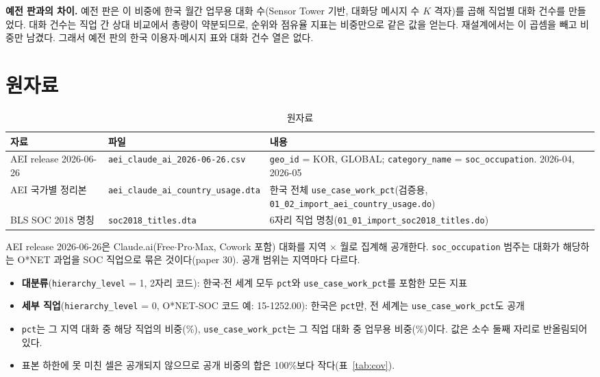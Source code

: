\documentclass[11pt]{article}
\begin{document}
\textbf{예전 판과의 차이.} 예전 판은 이 비중에 한국 월간 업무용 대화 수(Sensor Tower 기반, 대화당 메시지 수 $K$ 격자)를 곱해 직업별 대화 건수를 만들었다. 대화 건수는 직업 간 상대 비교에서 총량이 약분되므로, 순위와 점유율 지표는 비중만으로 같은 값을 얻는다. 재설계에서는 이 곱셈을 빼고 비중만 남겼다. 그래서 예전 판의 한국 이용자$\cdot$메시지 표와 대화 건수 열은 없다.

\section{원자료}

\begin{longtable}{L{3.6cm}L{5.2cm}L{6.4cm}}
\caption{원자료}\label{tab:src}\\
\toprule
자료 & 파일 & 내용 \\
\midrule
AEI release 2026-06-26 & \texttt{aei\_claude\_ai\_2026-06-26.csv} & \texttt{geo\_id} = KOR, GLOBAL; \texttt{category\_name} = \texttt{soc\_occupation}. 2026-04, 2026-05 \\
AEI 국가별 정리본 & \texttt{aei\_claude\_ai\_country\_usage.dta} & 한국 전체 \texttt{use\_case\_work\_pct}(검증용, \texttt{01\_02\_import\_aei\_country\_usage.do}) \\
BLS SOC 2018 명칭 & \texttt{soc2018\_titles.dta} & 6자리 직업 명칭(\texttt{01\_01\_import\_soc2018\_titles.do}) \\
\bottomrule
\end{longtable}

AEI release 2026-06-26은 Claude.ai(Free$\cdot$Pro$\cdot$Max, Cowork 포함) 대화를 지역 $\times$ 월로 집계해 공개한다. \texttt{soc\_occupation} 범주는 대화가 해당하는 O*NET 과업을 SOC 직업으로 묶은 것이다(paper 30). 공개 범위는 지역마다 다르다.
\begin{itemize}[leftmargin=*]
  \item \textbf{대분류}(\texttt{hierarchy\_level} = 1, 2자리 코드): 한국$\cdot$전 세계 모두 \texttt{pct}와 \texttt{use\_case\_work\_pct}를 포함한 모든 지표
  \item \textbf{세부 직업}(\texttt{hierarchy\_level} = 0, O*NET-SOC 코드 예: 15-1252.00): 한국은 \texttt{pct}만, 전 세계는 \texttt{use\_case\_work\_pct}도 공개
  \item \texttt{pct}는 그 지역 대화 중 해당 직업의 비중(\%), \texttt{use\_case\_work\_pct}는 그 직업 대화 중 업무용 비중(\%)이다. 값은 소수 둘째 자리로 반올림되어 있다.
  \item 표본 하한에 못 미친 셀은 공개되지 않으므로 공개 비중의 합은 100\%보다 작다(표~\ref{tab:cov}).
\end{itemize}
\end{document}
